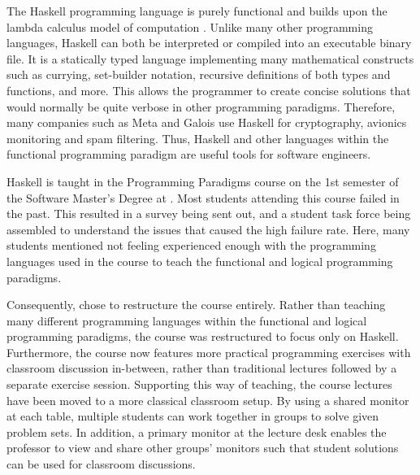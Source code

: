 The Haskell programming language is purely functional\cite{} and builds upon the lambda calculus model of computation \cite{} .
Unlike many other programming languages, Haskell can both be interpreted or compiled into an executable binary file.
It is a statically typed language implementing many mathematical constructs such as currying, set-builder notation, recursive definitions of both types and functions, and more.
This allows the programmer to create concise solutions that would normally be quite verbose in other programming paradigms.
Therefore, many companies such as Meta and Galois use Haskell for cryptography, avionics monitoring and spam filtering. 
Thus, Haskell and other languages within the functional programming paradigm are useful tools for software engineers.


Haskell is taught in the Programming Paradigms course on the 1st semester of the Software Master's Degree at \aau{}.
Most students attending this course failed in the past.
This resulted in a survey being sent out, and a student task force being assembled to understand the issues that caused the high failure rate.
Here, many students mentioned not feeling experienced enough with the programming languages used in the course to teach the functional and logical programming paradigms. 


Consequently, \aau{} chose to restructure the course entirely.
Rather than teaching many different programming languages within the functional and logical programming paradigms, the course was restructured to focus only on Haskell.
Furthermore, the course now features more practical programming exercises with classroom discussion in-between, rather than traditional lectures followed by a separate exercise session.
Supporting this way of teaching, the course lectures have been moved to a more classical classroom setup. 
By using a shared monitor at each table, multiple students can work together in groups to solve given problem sets.
In addition, a primary monitor at the lecture desk enables the professor to view and share other groups' monitors such that student solutions can be used for classroom discussions.



